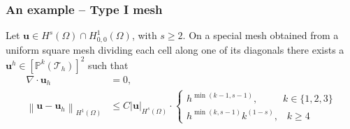 \documentclass{beamer}
\let\vec\mathbf
\newcommand{\norm}[1]{\left\lVert#1\right\rVert}
\newcommand{\abs}[1]{\left|#1\right|}
\begin{document}
	\begin{frame}
		\frametitle{An example -- Type I mesh}
		\begin{lemma}
			Let $\vec{u} \in H^s(\Omega)\cap H^{1}_{0,0}(\Omega)$, with $s\geq 2$. On a special mesh obtained from a uniform square mesh dividing each cell along one of its diagonals there exists a $\vec{u}^h \in [\mathbb{P}^k(\mathcal{T}_h) ]^2$ such that
			\begin{align*}
				\nabla\cdot \vec{u}_h &= 0, \\
				\norm{\vec{u}-\vec{u}_h}_{H^1(\Omega)} &\leq C\abs{\vec{u}}_{H^s(\Omega)}\cdot \begin{cases}
					h^{\min(k-1,s-1)},\;\;\qquad k\in \{1,2,3\}\\
					h^{\min(k,s-1)}k^{(1-s)},\;\;\; k \geq 4
				\end{cases}
			\end{align*}
		\end{lemma}
	\end{frame}
\end{document}
